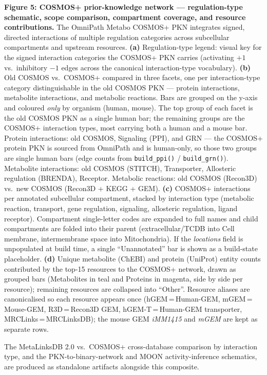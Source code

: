 \textbf{Figure 5: COSMOS+ prior-knowledge network --- regulation-type schematic, scope comparison, compartment coverage, and resource contributions.}
The OmniPath Metabo COSMOS+ PKN integrates signed, directed interactions of multiple regulation categories across subcellular compartments and upstream resources.
\textbf{(a)} Regulation-type legend: visual key for the signed interaction categories the COSMOS+ PKN carries (activating $+1$ vs.\ inhibitory $-1$ edges across the canonical interaction-type vocabulary).
\textbf{(b)} Old COSMOS vs.\ COSMOS+ compared in three facets, one per interaction-type category distinguishable in the old COSMOS PKN --- protein interactions, metabolite interactions, and metabolic reactions. Bars are grouped on the y-axis and coloured \emph{only} by organism (human, mouse). The top group of each facet is the old COSMOS PKN as a single human bar; the remaining groups are the COSMOS+ interaction types, most carrying both a human and a mouse bar. Protein interactions: old COSMOS, Signaling (PPI), and GRN --- the COSMOS+ protein PKN is sourced from OmniPath and is human-only, so those two groups are single human bars (edge counts from \texttt{build\_ppi()} / \texttt{build\_grn()}). Metabolite interactions: old COSMOS (STITCH), Transporter, Allosteric regulation (BRENDA), Receptor. Metabolic reactions: old COSMOS (Recon3D) vs.\ new COSMOS (Recon3D + KEGG + GEM).
\textbf{(c)} COSMOS+ interactions per annotated subcellular compartment, stacked by interaction type (metabolic reaction, transport, gene regulation, signaling, allosteric regulation, ligand receptor). Compartment single-letter codes are expanded to full names and child compartments are folded into their parent (extracellular/TCDB into Cell membrane, intermembrane space into Mitochondria). If the \textit{locations} field is unpopulated at build time, a single ``Unannotated'' bar is shown as a build-state placeholder.
\textbf{(d)} Unique metabolite (ChEBI) and protein (UniProt) entity counts contributed by the top-15 resources to the COSMOS+ network, drawn as grouped bars (Metabolites in teal and Proteins in magenta, side by side per resource); remaining resources are collapsed into ``Other''. Resource aliases are canonicalised so each resource appears once (hGEM\,=\,Human-GEM, mGEM\,=\,Mouse-GEM, R3D\,=\,Recon3D GEM, hGEM-T\,=\,Human-GEM transporter, MRCLinks\,=\,MRCLinksDB); the mouse GEM \textit{iMM1415} and \textit{mGEM} are kept as separate rows.

\smallskip
\noindent The MetaLinksDB 2.0 vs.\ COSMOS+ cross-database comparison by interaction type, and the PKN-to-binary-network and MOON activity-inference schematics, are produced as standalone artifacts alongside this composite.
